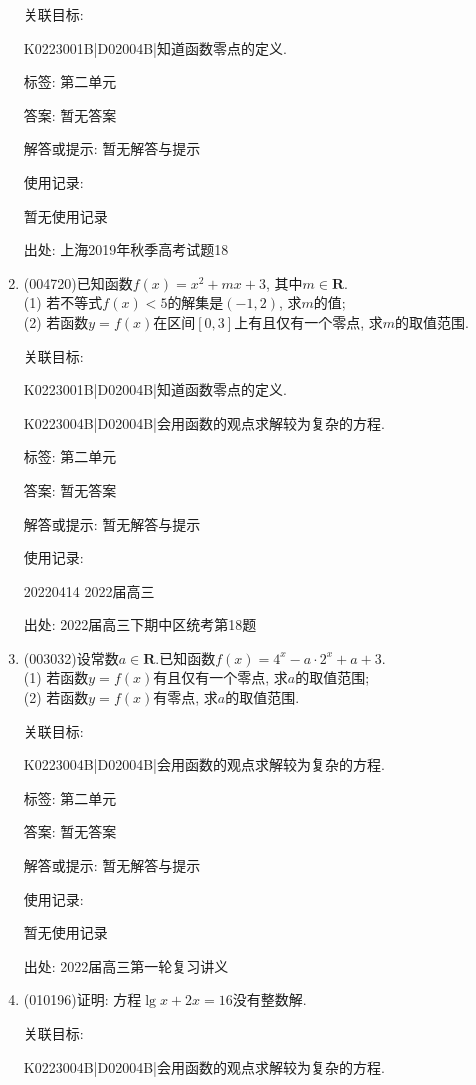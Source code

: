 \documentclass[10pt,a4paper]{article}
\begin{document}
\begin{enumerate}[1.]
关联目标:

K0223001B|D02004B|知道函数零点的定义.



标签: 第二单元

答案: 暂无答案

解答或提示: 暂无解答与提示

使用记录:

暂无使用记录


出处: 上海2019年秋季高考试题18
\item { (004720)}已知函数$f(x)=x^2+mx+3$, 其中$m\in \mathbf{R}$.\\
(1) 若不等式$f(x)<5$的解集是$(-1,2)$, 求$m$的值;\\
(2) 若函数$y=f(x)$在区间$[0,3]$上有且仅有一个零点, 求$m$的取值范围.


关联目标:

K0223001B|D02004B|知道函数零点的定义.

K0223004B|D02004B|会用函数的观点求解较为复杂的方程.



标签: 第二单元

答案: 暂无答案

解答或提示: 暂无解答与提示

使用记录:

20220414	2022届高三		


出处: 2022届高三下期中区统考第18题
\item { (003032)}设常数$a\in \mathbf{R}$.已知函数$f(x)=4^x-a\cdot 2^x+a+3$.\\
(1) 若函数$y=f(x)$有且仅有一个零点, 求$a$的取值范围;\\
(2) 若函数$y=f(x)$有零点, 求$a$的取值范围.


关联目标:

K0223004B|D02004B|会用函数的观点求解较为复杂的方程.



标签: 第二单元

答案: 暂无答案

解答或提示: 暂无解答与提示

使用记录:

暂无使用记录


出处: 2022届高三第一轮复习讲义
\item { (010196)}证明: 方程$\lg x+2x=16$没有整数解.


关联目标:

K0223004B|D02004B|会用函数的观点求解较为复杂的方程.




\end{enumerate}
\end{document}
